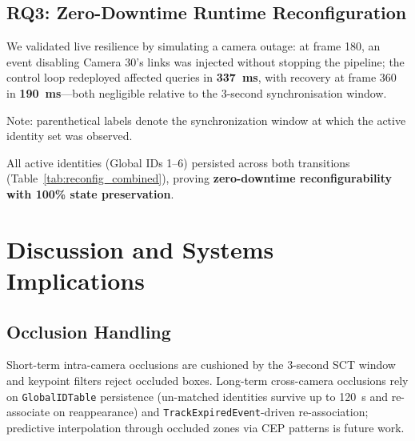 \documentclass[conference]{IEEEtran}
\begin{document}
\subsection{RQ3: Zero-Downtime Runtime Reconfiguration}
We validated live resilience by simulating a camera outage: at frame 180, an event disabling Camera 30's links was injected without stopping the pipeline; the control loop redeployed affected queries in \textbf{337~ms}, with recovery at frame 360 in \textbf{190~ms}---both negligible relative to the 3-second synchronisation window.

\begin{table}[t!]
\centering
\caption{Live Network Reconfiguration Timing and Global ID State Continuity}
\label{tab:reconfig_combined}
\vspace{2pt}
\parbox{\linewidth}{\raggedright\footnotesize Note: parenthetical labels denote the synchronization window at which the active identity set was observed.}
\end{table}

All active identities (Global IDs 1--6) persisted across both transitions (Table~\ref{tab:reconfig_combined}), proving \textbf{zero-downtime reconfigurability with 100\% state preservation}.

\section{Discussion and Systems Implications}
\label{sec:discussion}

\subsection{Occlusion Handling}
Short-term intra-camera occlusions are cushioned by the 3-second SCT window and keypoint filters reject occluded boxes. Long-term cross-camera occlusions rely on \texttt{GlobalIDTable} persistence (un-matched identities survive up to 120~s and re-associate on reappearance) and \texttt{TrackExpiredEvent}-driven re-association; predictive interpolation through occluded zones via CEP patterns is future work.
\end{document}
